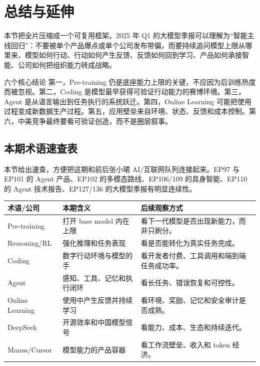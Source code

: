 \section{总结与延伸}

本节把全片压缩成一个可复用框架。2025 年 Q1 的大模型季报可以理解为“智能主线回归”：不要被单个产品爆点或单个公司发布带偏，而要持续追问模型上限从哪里来、模型如何行动、行动如何产生反馈、反馈如何回到学习、产品如何承接智能、公司如何把组织能力转成战略。

\begin{importantbox}{六个核心结论}
第一，Pre-training 仍是底座能力上限的关键，不应因为后训练热度而被忽视。第二，Coding 是模型最早获得可验证行动能力的赛博环境。第三，Agent 是从语言输出到任务执行的系统跃迁。第四，Online Learning 可能把使用过程变成新数据生产过程。第五，应用壁垒来自环境、状态、反馈和成本控制。第六，中美竞争最终要看可验证创造，而不是圈层叙事。
\end{importantbox}

\subsection{本期术语速查表}

本节给出速查，方便把这期和前后张小珺 AI/互联网队列连接起来。EP97 与 EP101 的 Agent 产品、EP102 的多模态路线、EP106/109 的具身智能、EP110 的 Agent 技术报告、EP127/136 的大模型季报有明显连续性。

\noindent\begin{tabularx}{\textwidth}{p{}p{}X}
\toprule
术语/公司 & 本期含义 & 后续观察方式 \\
\midrule
Pre-training & 打开 base model 内在上限 & 看下一代模型是否出现新能力，而非只刷分。 \\
Reasoning/RL & 强化推理和任务表现 & 看是否能转化为真实任务完成。 \\
Coding & 数字行动环境与模型的手 & 看开发者付费、工具调用和端到端任务成功率。 \\
Agent & 感知、工具、记忆和执行闭环 & 看长任务、错误恢复和可控性。 \\
Online Learning & 使用中产生反馈并持续学习 & 看环境、奖励、记忆和安全审计是否成熟。 \\
DeepSeek & 开源效率和中国模型信号 & 看能力、成本、生态和持续迭代。 \\
Manus/Cursor & 模型能力的产品容器 & 看工作流壁垒、收入和 token 经济。 \\
\bottomrule
\end{tabularx}

